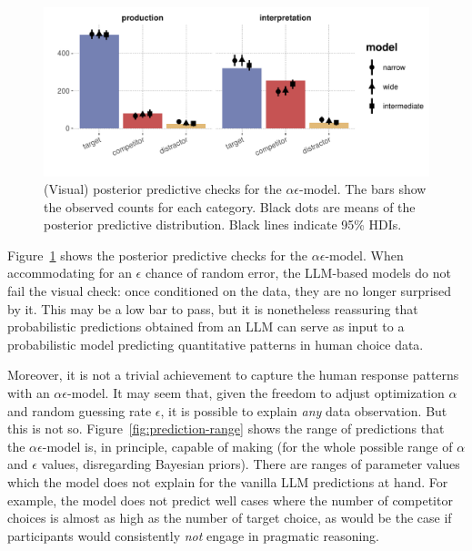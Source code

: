 \documentclass{article}
\begin{document}
\begin{figure}[t]
  \centering

  \includegraphics[width = 0.9 \textwidth]{00-pics/PPC-alpha-eps-model.pdf}

    \caption{(Visual) posterior predictive checks for the $\alpha\epsilon$-model.
    The bars show the observed counts for each category.
    Black dots are means of the posterior predictive distribution.
    Black lines indicate 95\% HDIs.
  }

  \label{fig:PPC-alpha-eps-model}
\end{figure}

Figure~\ref{fig:PPC-alpha-eps-model} shows the posterior predictive checks for the \(\alpha\epsilon\)-model.
When accommodating for an \(\epsilon\) chance of random error, the LLM-based models do not fail the visual check: once conditioned on the data, they are no longer surprised by it.
This may be a low bar to pass, but it is nonetheless reassuring that probabilistic predictions obtained from an LLM can serve as input to a probabilistic model predicting quantitative patterns in human choice data.

Moreover, it is not a trivial achievement to capture the human response patterns with an $\alpha\epsilon$-model.
It may seem that, given the freedom to adjust optimization $\alpha$ and random guessing rate $\epsilon$, it is possible to explain \emph{any} data observation.
But this is not so.
Figure~\ref{fig:prediction-range} shows the range of predictions that the $\alpha\epsilon$-model is, in principle, capable of making (for the whole possible range of \(\alpha\) and \(\epsilon\) values, disregarding Bayesian priors).
There are ranges of parameter values which the model does not explain for the vanilla LLM predictions at hand.
For example, the model does not predict well cases where the number of competitor choices is almost as high as the number of target choice, as would be the case if participants would consistently \emph{not} engage in pragmatic reasoning.
\end{document}

